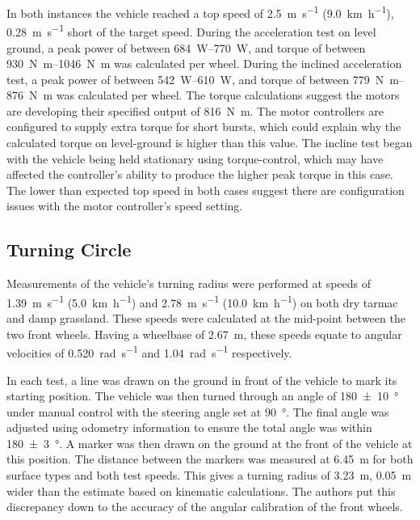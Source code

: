 \documentclass[preprint,authoryear,12pt]{elsarticle}
\begin{document}
    In both instances the vehicle reached a top speed of \SI{2.5}{\meter\per\second} (\SI{9.0}{\kilo\meter\per\hour}), \SI{0.28}{\meter\per\second} short of the target speed.
    During the acceleration test on level ground, a peak power of between \SIrange{684}{770}{\watt}, and torque of between \SIrange{930}{1046}{\newton\meter} was calculated per wheel.
    During the inclined acceleration test, a peak power of between \SIrange{542}{610}{\watt}, and torque of between \SIrange{779}{876}{\newton\meter} was calculated per wheel.
    The torque calculations suggest the motors are developing their specified output of \SI{816}{\newton\meter}.
    The motor controllers are configured to supply extra torque for short bursts, which could explain why the calculated torque on level-ground is higher than this value.
    The incline test began with the vehicle being held stationary using torque-control, which may have affected the controller's ability to produce the higher peak torque in this case.
    The lower than expected top speed in both cases suggest there are configuration issues with the motor controller's speed setting.

  \subsection{Turning Circle}

    Measurements of the vehicle's turning radius were performed at speeds of \SI{1.39}{\meter\per\second} (\SI{5.0}{\kilo\meter\per\hour}) and \SI{2.78}{\meter\per\second} (\SI{10.0}{\kilo\meter\per\hour}) on both dry tarmac and damp grassland.
    These speeds were calculated at the mid-point between the two front wheels.
    Having a wheelbase of \SI{2.67}{\meter}, these speeds equate to angular velocities of \SI{0.520}{\radian\per\second} and \SI{1.04}{\radian\per\second} respectively.

    In each test, a line was drawn on the ground in front of the vehicle to mark its starting position.
    The vehicle was then turned through an angle of \SI[separate-uncertainty=true]{180(10)}{\degree} under manual control with the steering angle set at \SI{90}{\degree}.
    The final angle was adjusted using odometry information to ensure the total angle was within \SI[separate-uncertainty=true]{180(3)}{\degree}.
    A marker was then drawn on the ground at the front of the vehicle at this position.
    The distance between the markers was measured at \SI{6.45}{\meter} for both surface types and both test speeds.
    This gives a turning radius of \SI{3.23}{\meter}, \SI{0.05}{\meter} wider than the estimate based on kinematic calculations.
    The authors put this discrepancy down to the accuracy of the angular calibration of the front wheels.
\end{document}
